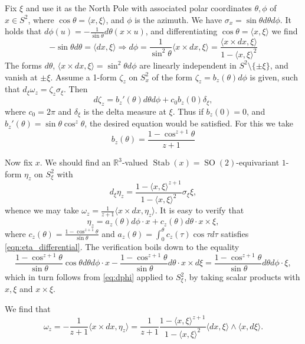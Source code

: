 \documentclass[reqno,10pt]{amsart}
\DeclareMathOperator{\Stab}{Stab}
\DeclareMathOperator{\SO}{SO}
\newcommand{\R}{\mathbb{R}}
\begin{document}
Fix $\xi$ and use it as the North Pole with associated polar coordinates $\theta, \phi$ of $x\in S^2$, where $\cos\theta=\langle x,\xi\rangle$, and $\phi$ is the azimuth. We have $\sigma_x=\sin\theta d\theta d\phi$. It holds that $d\phi(u)=-\frac{1}{\sin\theta}d\theta(x\times u)$, and differentiating $\cos\theta=\langle x,\xi\rangle$ we find
\begin{equation}\label{eq:dphi} -\sin \theta d\theta=\langle dx, \xi\rangle\Rightarrow d\phi=\frac{1}{\sin^2\theta}\langle x\times dx, \xi\rangle=\frac{\langle x\times dx, \xi\rangle}{1-\langle x,\xi\rangle^2} \end{equation}
The forms $d\theta$, $\langle x\times dx,\xi\rangle=\sin^2\theta d\phi$ are linearly independent in $S^2\setminus \{\pm \xi\}$, and vanish at $\pm\xi$. 
Assume a 1-form $\zeta_z$ on $S^2_x$ of the form $\zeta_z=b_z(\theta)d\phi$ is given, such that $d_\xi\omega_z= \zeta_z \sigma_\xi.$  Then
\[ d\zeta_z=b_z'(\theta) d\theta d\phi+ c_0 b_z(0)\delta_\xi,  \]
where $c_0=2\pi$ and $\delta_\xi$ is the delta measure at $\xi$.
Thus if $b_z(0)=0$, and $b_z'(\theta)=\sin\theta\cos^z\theta$, the desired equation would be satisfied. For this we take 
\[b_z(\theta)=\frac{1-\cos^{z+1}\theta}{z+1	} \]

Now fix $x$. We should find an  $\R^3$-valued $\Stab(x)=\SO(2)$-equivariant $1$-form $\eta_z$ on $S^2_\xi$ with 
\begin{equation}\label{eqn:eta_differential}d_\xi\eta_z=\frac{1-\langle x,\xi\rangle^{z+1}}{1-\langle x,\xi\rangle^2}  \sigma_\xi \xi, \end{equation}
whence we may take $\omega_z= \frac{1}{z+1}  \langle x\times dx, \eta_z\rangle $.
It is easy to verify that $$\eta_z=a_z(\theta)d\phi \cdot x+c_z(\theta)d\theta \cdot x\times\xi,$$ where $c_z(\theta)=\frac{1-\cos^{z+1}\theta}{\sin\theta}$ and $a_z(\theta)=\int_0^\theta c_z(\tau)\cos\tau d\tau$ satisfies \eqref{eqn:eta_differential}. The verification boils down to the equality 
$$\frac{1-\cos^{z+1}\theta}{\sin\theta}\cos\theta d\theta d\phi\cdot x-\frac{1-\cos^{z+1}\theta}{\sin\theta}d\theta \cdot x\times d\xi=\frac{1-\cos^{z+1}\theta}{\sin\theta}d\theta d\phi\cdot \xi,$$ which in turn follows from \eqref{eq:dphi} applied to $S^2_\xi$, by taking scalar products with $x,\xi$ and $x\times\xi$.

We find that \[\omega_z=-\frac{1}{z+1}\langle x\times dx, \eta_z\rangle=\frac{1}{z+1}\frac{1-\langle x,\xi\rangle^{z+1}}{1-\langle x,\xi\rangle^2}\langle dx,\xi\rangle\wedge \langle x,  d\xi\rangle.\]
\end{document}
